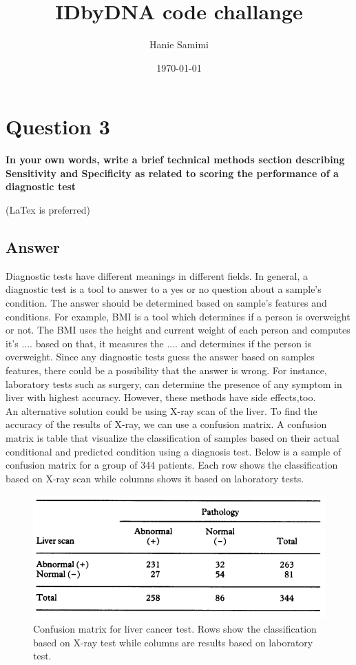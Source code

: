 \documentclass[12pt]{article}
\title{IDbyDNA code challange} %
\author{Hanie Samimi}%
\date{\today} %
\begin{document}
\setlength{\droptitle}{-5em}    
\maketitle


\section*{Question 3}
{\bfseries In your own words, write a brief technical methods section describing Sensitivity and Specificity as related to scoring the performance of a diagnostic test}

(LaTex is preferred)
\subsection*{Answer}
Diagnostic tests have different meanings in different fields. In general, a diagnostic test is
a tool to answer to a yes or no question about a sample's condition. The answer should be determined based on sample's features and conditions. For example, BMI is a tool which determines if a person is overweight or not. The BMI uses the height and current weight of each person and computes it's .... based on that, it measures the .... and determines if the person is overweight.
Since any diagnostic tests guess the answer based on samples features, there could be a possibility that the answer is wrong. For instance, laboratory tests such as surgery, can determine the presence of any symptom in liver with highest accuracy. However, these methods have side effects,too.\\
An alternative solution could be using X-ray scan of the liver. To find the accuracy of the results of X-ray, we can use a confusion matrix. A confusion matrix is table that visualize the classification of samples based on their actual conditional and predicted condition using a diagnosis test. Below is a sample of confusion matrix for a group of 344 patients. Each row shows the classification based on X-ray scan while columns shows it based on laboratory tests.   

\begin{figure}
\includegraphics[width=\textwidth]{confusionMatrix.png}
\caption{Confusion matrix for liver cancer test. Rows show the classification based on X-ray test while columns are results based on laboratory test.} \label{fig1}
\end{figure}
\end{document}
